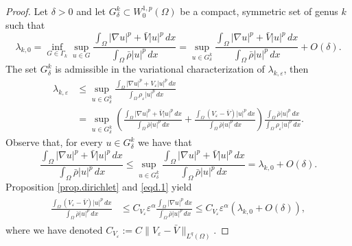 \documentclass[10pt,a4paper]{amsart}
\begin{document}
\begin{proof}
Let $\delta>0$ and let $G_\delta^k\subset W^{1,p}_0(\Omega)$ be a compact, symmetric set of genus $k$ such that 
$$
\lambda_{k,0} = \inf_{G\in \Gamma_k} \sup_{u\in G} \frac{\int_\Omega |\nabla u|^p + \bar V |u|^p \,dx}{\int_\Omega \bar \rho |u|^p\,dx} 
= \sup_{u\in G_\delta^k} \frac{\int_\Omega |\nabla u|^p + \bar V |u|^p\,dx}{\int_\Omega \bar \rho |u|^p\,dx} + O(\delta).
$$
The set $G_\delta^k$ is admissible in the variational characterization of $\lambda_{k,\varepsilon}$, then
\begin{align*}
\lambda_{k,\varepsilon} &\leq \sup_{u\in G_\delta^k} \frac{\int_\Omega |\nabla u|^p  +   V_\varepsilon |u|^p\,dx}{\int_\Omega  \rho_\varepsilon |u|^p\,dx}\\ 
&=  \sup_{u\in G_\delta^k} \left( \frac{\int_\Omega |\nabla u|^p + \bar V |u|^p \,dx}{\int_\Omega  \bar \rho |u|^p\,dx}  +  \frac{\int_\Omega (V_\varepsilon - \bar V) |u|^p \,dx}{\int_\Omega  \bar \rho |u|^p\,dx} \right)
\frac{\int_\Omega  \bar \rho |u|^p\,dx}{\int_\Omega  \rho_\varepsilon |u|^p\,dx} . 
\end{align*}
Observe that, for every $u\in G_\delta^k$ we have that
\begin{equation} \label{eqd.1}
\frac{\int_\Omega |\nabla u|^p + \bar V |u|^p \,dx}{\int_\Omega  \bar \rho |u|^p  \,dx} \leq  \sup_{u\in G_\delta^k} \frac{\int_\Omega |\nabla u|^p + \bar V |u|^p\,dx}{\int_\Omega  \bar \rho |u|^p\,dx} = \lambda_{k,0}+O(\delta). 
\end{equation}
Proposition \ref{prop.dirichlet} and \eqref{eqd.1} yield
\begin{align} \label{eqd.2}
\begin{split}
\frac{\int_\Omega (V_\varepsilon - \bar V) |u|^p \,dx}{\int_\Omega  \bar \rho |u|^p\,dx} &\leq  C_{V_\varepsilon}
 \varepsilon^\alpha    \frac{\int_\Omega  |\nabla u|^p \,dx}{\int_\Omega  \bar \rho |u|^p\,dx}\leq
 C_{V_\varepsilon} \varepsilon^\alpha   (\lambda_{k,0}+O(\delta)),
\end{split}
\end{align}
where we have denoted $C_{V_\varepsilon}:=C\|V_\varepsilon - \bar V\|_{L^q(\Omega)}$.



\end{proof}
\end{document}
